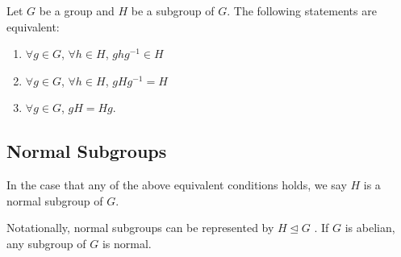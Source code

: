 \begin{lemma}
   Let \( G  \) be a group and \( H \) be a subgroup of \( G  \). The following statements are equivalent:
   \begin{enumerate}
       \item[(1)] \( \forall g \in G  \), \( \forall h \in H  \), \( g h g^{-1} \in H  \)
        \item[(2)] \( \forall g \in G  \), \( \forall h \in H \), \( g H g^{-1} = H  \)
        \item[(3)] \( \forall g \in G  \), \( g H = H g \).
   \end{enumerate}
\end{lemma} 

\subsection{Normal Subgroups}

\begin{definition}
    In the case that any of the above equivalent conditions holds, we say \( H  \) is a normal subgroup of \( G  \).
\end{definition}

Notationally, normal subgroups can be represented by \( H \trianglelefteq G  \) . If \( G  \) is abelian, any subgroup of \( G  \) is normal.

